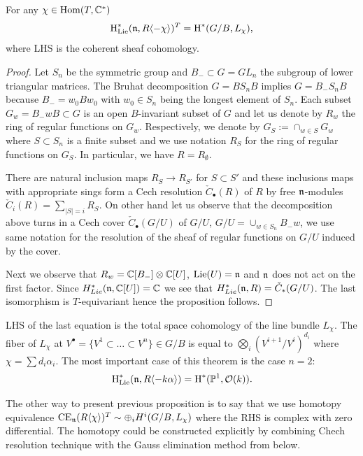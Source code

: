 \begin{proposition}\label{prop: homs G/B} For any \(\chi\in \mathop{{\rm Hom}}\nolimits(T,\mathbb{C}^*)\)
  $$ \textup{H}^*_{\mathrm{Lie}}(\mathfrak{n},R\langle -\chi\rangle)^T=\textup{H}^*(G/B,L_\chi),$$
  where LHS is the coherent sheaf cohomology.
\end{proposition}
\begin{proof}
  Let \(S_n\) be the symmetric group  and \(B_-\subset G=GL_n\) the subgroup of lower triangular matrices.
  The Bruhat decomposition \(G=B S_n B\) implies   \(G=B_- S_n B\) because \(B_-=w_0 B w_0\) with \(w_0\in S_n\) being the longest element of \(S_n\).
  Each subset \(G_w=B_- w B\subset G\) is an open \(B\)-invariant subset of \(G\) and let us denote by \(R_w\) the ring of regular functions on \(G_w\).
  Respectively, we denote by \(G_{S}:=\cap_{w\in S} G_{w}\) where \(S\subset S_n\) is a finite subset and we use notation \(R_S\) for the ring of regular
  functions on \(G_S\). In particular, we have \(R=R_\emptyset\).
  
  There are natural inclusion maps \(R_S\to R_{S'}\) for \(S\subset S'\) and these inclusions maps with appropriate sings form a Cech  resolution \(\check{C}_\bullet(R)\) of
  \(R\) by free \(\mathfrak{n}\)-modules \(\check{C}_i(R)=\sum_{|S|=i} R_S\). On other hand let us observe that the decomposition above turns in a  Cech cover \(\check{C}_\bullet(G/U)\) of
  \(G/U\), \(G/U=\cup_{w\in S_n} B_-w\), we use same notation for the resolution of the sheaf of regular functions on \(G/U\) induced by the cover.
  
  Next we observe that \(R_w=\mathbb{C}[B_-]\otimes \mathbb{C}[U]\), \(\mathrm{Lie}(U)=\mathfrak{n}\) and \(\mathfrak{n}\) does
  not act on the first factor. Since \(H^*_{Lie}(\mathfrak{n},\mathbb{C}[U])=\mathbb{C}\) we see that \(H^*_{Lie}(\mathfrak{n},R)=\check{C}_*(G/U)\). The last isomorphism is \(T\)-equivariant hence the proposition
  follows.
  
  
\end{proof}


LHS of the last equation is the total space cohomology of the line bundle $L_\chi$. The fiber of $L_\chi$ at $V^\bullet=\{V^1\subset \dots\subset V^n \}\in G/B$ is equal to
$\bigotimes_i (V^{i+1}/V^i)^{d_i}$ where $\chi=\sum d_i \alpha_i$. The most important case of this theorem is the case $n=2$:
$$\textup{H}^*_{\mathrm{Lie}}(\mathfrak{n}, R\langle -k\alpha \rangle)=\textup{H}^*(\mathbb{P}^1,\mathcal{O}(k)).$$

The other way to present previous proposition is to say that we use homotopy equivalence $\mathrm{CE}_{\mathfrak{n}}(R\langle\chi\rangle)^T\sim \oplus_i H^i(G/B,L_\chi)$ where the RHS is complex with zero differential.
The homotopy could be constructed explicitly by combining Chech resolution technique with the Gauss elimination method from below.

